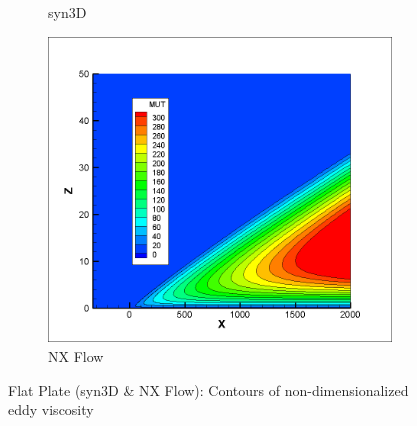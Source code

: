 \begin{figure}[ht!]
\begin{subfigure}{.32\textwidth}
  \caption{syn3D}
\end{subfigure}
\begin{subfigure}{.32\textwidth}
  \centering
  \includegraphics[width=1.0\textwidth]{figs/flatnx/mut_contour.png}
  \caption{NX Flow}
\end{subfigure}
\caption{Flat Plate (syn3D \& NX Flow): Contours of non-dimensionalized eddy viscosity}
\label{fig:flatmutcontour}
\end{figure}

